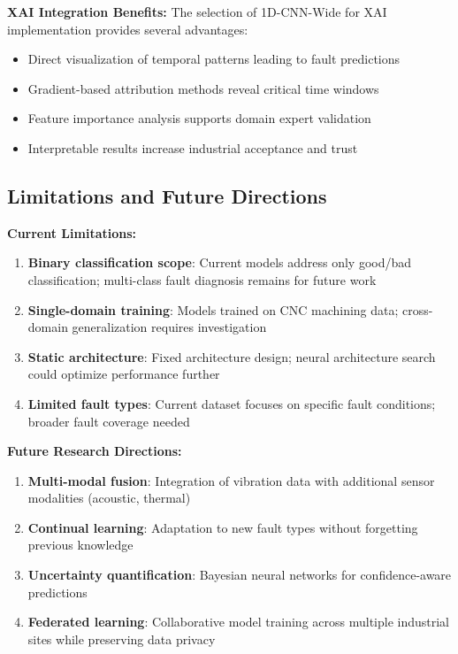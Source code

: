 \documentclass[12pt]{article}
\begin{document}
\textbf{XAI Integration Benefits:}
The selection of 1D-CNN-Wide for XAI implementation provides several advantages:
\begin{itemize}
    \item Direct visualization of temporal patterns leading to fault predictions
    \item Gradient-based attribution methods reveal critical time windows
    \item Feature importance analysis supports domain expert validation
    \item Interpretable results increase industrial acceptance and trust
\end{itemize}

\subsection{Limitations and Future Directions}

\textbf{Current Limitations:}
\begin{enumerate}
    \item \textbf{Binary classification scope}: Current models address only good/bad classification; multi-class fault diagnosis remains for future work
    \item \textbf{Single-domain training}: Models trained on CNC machining data; cross-domain generalization requires investigation
    \item \textbf{Static architecture}: Fixed architecture design; neural architecture search could optimize performance further
    \item \textbf{Limited fault types}: Current dataset focuses on specific fault conditions; broader fault coverage needed
\end{enumerate}

\textbf{Future Research Directions:}
\begin{enumerate}
    \item \textbf{Multi-modal fusion}: Integration of vibration data with additional sensor modalities (acoustic, thermal)
    \item \textbf{Continual learning}: Adaptation to new fault types without forgetting previous knowledge
    \item \textbf{Uncertainty quantification}: Bayesian neural networks for confidence-aware predictions
    \item \textbf{Federated learning}: Collaborative model training across multiple industrial sites while preserving data privacy
\end{enumerate}
\end{document}
